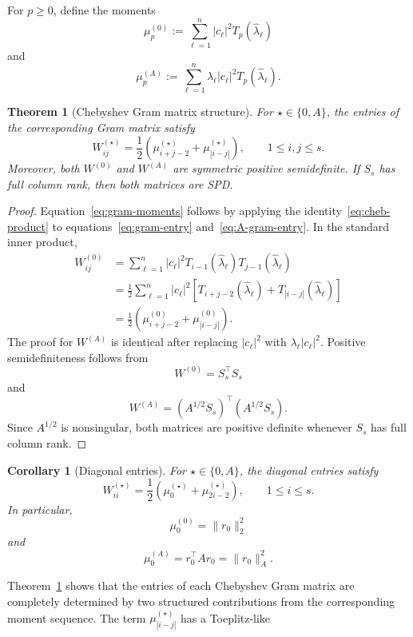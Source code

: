 \documentclass[pdflatex,sn-mathphys-num]{sn-jnl}%
\newtheorem{theorem}{Theorem}
\newtheorem{corollary}{Corollary}
\begin{document}
For $p\geq0$, define the moments
\[
\mu_p^{(0)}
:=
\sum_{\ell=1}^n
|c_\ell|^2T_p(\widehat{\lambda}_\ell)
\]
and
\[
\mu_p^{(A)}
:=
\sum_{\ell=1}^n
\lambda_\ell|c_\ell|^2
T_p(\widehat{\lambda}_\ell).
\]
\begin{theorem}[Chebyshev Gram matrix structure]
\label{thm:gram-structure}
For $\star\in\{0,A\}$, the entries of the corresponding Gram matrix
satisfy
\begin{equation}
\label{eq:gram-moments}
W^{(\star)}_{ij}
=
\frac{1}{2}
\left(
\mu_{i+j-2}^{(\star)}
+
\mu_{|i-j|}^{(\star)}
\right),
\qquad
1\leq i,j\leq s.
\end{equation}
Moreover, both $W^{(0)}$ and $W^{(A)}$ are symmetric positive
semidefinite. If $S_{s}$ has full column rank, then both matrices
are SPD.
\end{theorem}
\begin{proof}
Equation~\eqref{eq:gram-moments} follows by applying the identity~\eqref{eq:cheb-product} to
equations~\eqref{eq:gram-entry} and~\eqref{eq:A-gram-entry}. In the
standard inner product,
\begin{align*}
W^{(0)}_{ij}
&=
\sum_{\ell=1}^n
|c_\ell|^2
T_{i-1}(\widehat{\lambda}_\ell)
T_{j-1}(\widehat{\lambda}_\ell)
\\
&=
\frac{1}{2}
\sum_{\ell=1}^n
|c_\ell|^2
\left[
T_{i+j-2}(\widehat{\lambda}_\ell)
+
T_{|i-j|}(\widehat{\lambda}_\ell)
\right]
\\
&=
\frac{1}{2}
\left(
\mu_{i+j-2}^{(0)}
+
\mu_{|i-j|}^{(0)}
\right).
\end{align*}
The proof for $W^{(A)}$ is identical after replacing
$|c_\ell|^2$ with $\lambda_\ell|c_\ell|^2$.
Positive semidefiniteness follows from
\[
W^{(0)}=S_{s}^\top S_{s}
\]
and
\[
W^{(A)}
=
(A^{1/2}S_{s})^\top(A^{1/2}S_{s}).
\]
Since $A^{1/2}$ is nonsingular, both matrices are positive definite
whenever $S_{s}$ has full column rank.
\end{proof}
\begin{corollary}[Diagonal entries]
\label{cor:diagonal}
For $\star\in\{0,A\}$, the diagonal entries satisfy
\[
W^{(\star)}_{ii}
=
\frac{1}{2}
\left(
\mu_0^{(\star)}
+
\mu_{2i-2}^{(\star)}
\right),
\qquad
1\leq i\leq s.
\]
In particular,
\[
\mu_0^{(0)}
=
\|r_0\|_2^2
\]
and
\[
\mu_0^{(A)}
=
r_0^\top A r_0
=
\|r_0\|_A^2.
\]
\end{corollary}
Theorem~\ref{thm:gram-structure} shows that the entries of each
Chebyshev Gram matrix are completely determined by two structured
contributions from the corresponding moment sequence.  The term $\mu_{|i-j|}^{(\star)}$ has a Toeplitz-like
\end{document}
